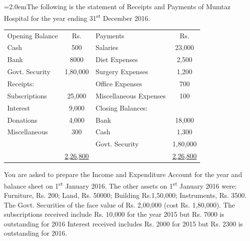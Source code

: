 \documentclass[11pt,a4paper]{article}
\newcommand{\lqn}[2]{\Needspace{6\baselineskip}\par\medskip\noindent\hangindent=2.0em\hangafter=1\makebox[2.0em][l]{\textbf{#1.}}#2\par}
\begin{document}
\lqn{27}{The following is the statement of Receipts and Payments of Mumtaz Hospital for the year ending 31\textsuperscript{st}  December 2016.\par
\par\smallskip\noindent\hspace*{1.2em}\begin{tabular}{|lclc|}
\hline
Opening Balance & Rs. & Payments & Rs. \\
Cash & 500 & Salaries & 23,000 \\
Bank & 8000 & Diet Expenses & 2,500 \\
Govt. Security & 1,80,000 & Surgery Expenses & 1,200 \\
Receipts: &  & Office Expenses & 700 \\
Subscriptions & 25,000 & Miscellaneous Expenses & 100 \\
Interest & 9,000 & Closing Balances: &  \\
Donations & 4,000 & Bank & 18,000 \\
Miscellaneous & 300 & Cash & 1,300 \\
 &  & Govt. Security & 1,80,000 \\
 & \underline{2,26,800} &  & \underline{2,26,800} \\
\hline
\end{tabular}\par\smallskip
You are asked to prepare the Income and Expenditure Account for the year and balance sheet on 1\textsuperscript{st}  January 2016. The other assets on 1\textsuperscript{st}  January 2016 were: Furniture, Rs. 200; Land, Rs. 50000; Building Rs.1,50,000; Instruments, Rs. 3500. The Govt. Securities of the face value of Rs. 2,00,000 (cost Rs. 1,80,000). The subscriptions received include Rs. 10,000 for the year 2015 but Rs. 7000 is outstanding for 2016 Interest received includes Rs. 2000 for 2015 but Rs. 2300 is outstanding for 2016.\par
}
\end{document}
